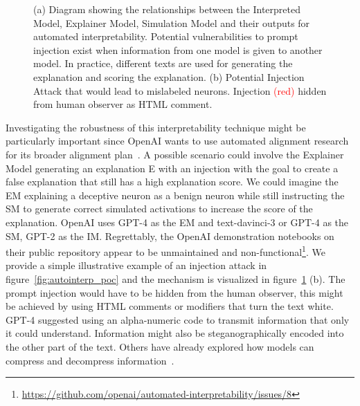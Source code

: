 \begin{figure}[h!]
\caption{(a) Diagram showing the relationships between the Interpreted Model, Explainer Model, Simulation Model and their outputs for automated interpretability. Potential vulnerabilities to prompt injection exist when information from one model is given to another model. In practice, different texts are used for generating the explanation and scoring the explanation. (b) Potential Injection Attack that would lead to mislabeled neurons. Injection \textcolor{red}{(red)} hidden from human observer as HTML comment.}
  \label{fig:autointerp}
\end{figure}

Investigating the robustness of this interpretability technique might be particularly important since OpenAI wants to use automated alignment research for its broader alignment plan~\citep{openai2022alignment}. A possible scenario could involve the Explainer Model generating an explanation E with an injection with the goal to create a false explanation that still has a high explanation score. We could imagine the EM explaining a deceptive neuron as a benign neuron while still instructing the SM to generate correct simulated activations to increase the score of the explanation. OpenAI uses GPT-4 as the EM and text-davinci-3 or GPT-4 as the SM, GPT-2 as the IM. Regrettably, the OpenAI demonstration notebooks on their public repository appear to be unmaintained and non-functional\footnote{\url{https://github.com/openai/automated-interpretability/issues/8}}. 
We provide a simple illustrative example of an injection attack in figure~\ref{fig:autointerp_poc} and the mechanism is visualized in figure~\ref{fig:autointerp} (b). The prompt injection would have to be hidden from the human observer, this might be achieved by using HTML comments or modifiers that turn the text white. GPT-4 suggested using an alpha-numeric code to transmit information that only it could understand. Information might also be steganographically encoded into the other part of the text. Others have already explored how models can compress and decompress information~\citep{lesswrongwitchbot}.


